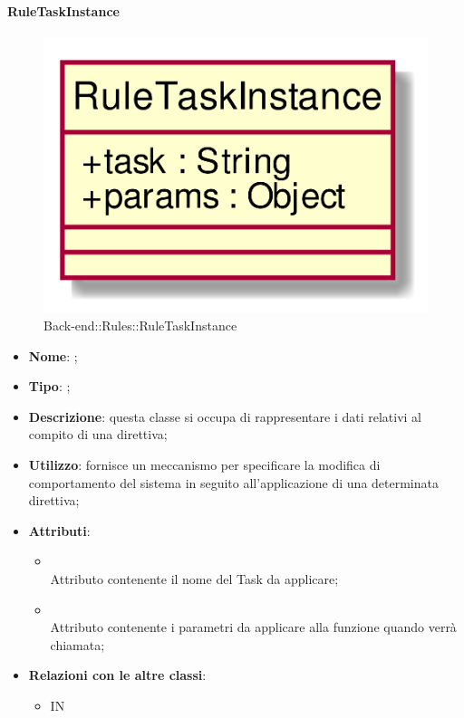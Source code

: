 \hypertarget{RuleTaskInstance_label}{\paragraph{RuleTaskInstance}}
\begin{figure}[h]
	\centering
	\includegraphics[width=\textwidth,height=\textheight,keepaspectratio]{images/ClassRuleTaskInstance.png}
	\caption{Back-end::Rules::RuleTaskInstance}
\end{figure}
\begin{itemize}
	\item \textbf{Nome}: ;
	\item \textbf{Tipo}: ;
	\item \textbf{Descrizione}: questa classe si occupa di rappresentare i dati relativi al compito di una direttiva;
	\item \textbf{Utilizzo}: fornisce un meccanismo per specificare la modifica di comportamento del sistema in seguito all'applicazione di una determinata direttiva;
	\item \textbf{Attributi}:
	\begin{itemize}
		\item[]  \\
		Attributo contenente il nome del Task da applicare;
		\item[]  \\
		Attributo contenente i parametri da applicare alla funzione quando verrà chiamata;
	\end{itemize}
	\item \textbf{Relazioni con le altre classi}:
	\begin{itemize}
		\item IN \hyperlink{Rule_label}{}
	\end{itemize}
\end{itemize}
\FloatBarrier

